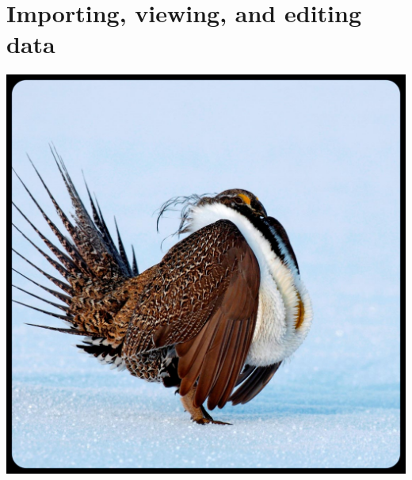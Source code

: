 \documentclass[
]{book}
\begin{document}
\hypertarget{importing-viewing-and-editing-data}{%
\section{Importing, viewing, and editing data}\label{importing-viewing-and-editing-data}}

\begin{center}\includegraphics[width=0.7\linewidth]{images/sage-grouse} \end{center}
\end{document}
